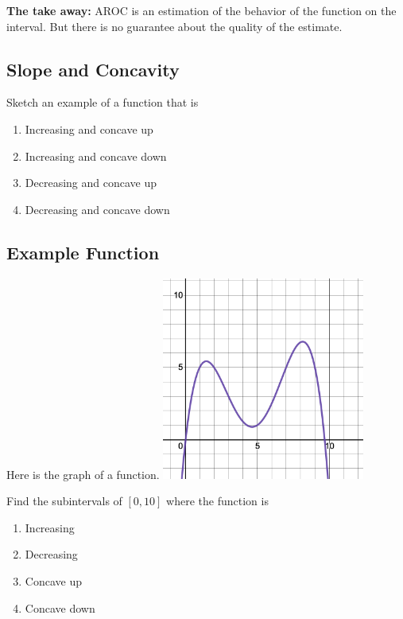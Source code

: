 \documentclass[
]{book}
\providecommand{\tightlist}{%
  \setlength{\itemsep}{0pt}\setlength{\parskip}{0pt}}
\begin{document}
\textbf{The take away:} AROC is an estimation of the behavior of the function on the interval. But there is no guarantee about the quality of the estimate.

\hypertarget{slope-and-concavity-1}{%
\subsection{Slope and Concavity}\label{slope-and-concavity-1}}

Sketch an example of a function that is

\begin{enumerate}
\def\labelenumi{\arabic{enumi}.}
\tightlist
\item
  Increasing and concave up
\item
  Increasing and concave down
\item
  Decreasing and concave up
\item
  Decreasing and concave down
\end{enumerate}

\hypertarget{example-function}{%
\subsection{Example Function}\label{example-function}}

Here is the graph of a function.
\includegraphics[width=0.5\textwidth,height=\textheight]{images/slope-concavity-example.png}

Find the subintervals of \([0,10]\) where the function is

\begin{enumerate}
\def\labelenumi{\arabic{enumi}.}
\tightlist
\item
  Increasing
\item
  Decreasing
\item
  Concave up
\item
  Concave down
\end{enumerate}
\end{document}
